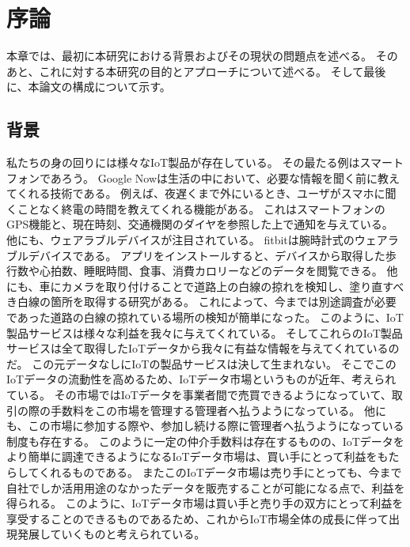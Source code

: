 
\renewcommand{\part}{Contents}
\renewcommand{\prechaptername}{第 }
\renewcommand{\postchaptername}{ 章}

\chapter{序論}
 
本章では、最初に本研究における背景およびその現状の問題点を述べる。
そのあと、これに対する本研究の目的とアプローチについて述べる。
そして最後に、本論文の構成について示す。

\section{背景}
私たちの身の回りには様々なIoT製品が存在している。
その最たる例はスマートフォンであろう。
Google Now\cite{google_now}は生活の中において、必要な情報を聞く前に教えてくれる技術である。
例えば、夜遅くまで外にいるとき、ユーザがスマホに聞くことなく終電の時間を教えてくれる機能がある。
これはスマートフォンのGPS機能と、現在時刻、交通機関のダイヤを参照した上で通知を与えている。
他にも、ウェアラブルデバイスが注目されている。
fitbit\cite{fitbit}は腕時計式のウェアラブルデバイスである。
アプリをインストールすると、デバイスから取得した歩行数や心拍数、睡眠時間、食事、消費カロリーなどのデータを閲覧できる。
他にも、車にカメラを取り付けることで道路上の白線の掠れを検知し、塗り直すべき白線の箇所を取得する研究\cite{dragnman_hakusen}がある。
これによって、今までは別途調査が必要であった道路の白線の掠れている場所の検知が簡単になった。
このように、IoT製品サービスは様々な利益を我々に与えてくれている。
そしてこれらのIoT製品サービスは全て取得したIoTデータから我々に有益な情報を与えてくれているのだ。
この元データなしにIoTの製品サービスは決して生まれない。
そこでこのIoTデータの流動性を高めるため、IoTデータ市場というものが近年、考えられている。
その市場ではIoTデータを事業者間で売買できるようになっていて、取引の際の手数料をこの市場を管理する管理者へ払うようになっている。
他にも、この市場に参加する際や、参加し続ける際に管理者へ払うようになっている制度も存在する。
このように一定の仲介手数料は存在するものの、IoTデータをより簡単に調達できるようになるIoTデータ市場は、買い手にとって利益をもたらしてくれるものである。
またこのIoTデータ市場は売り手にとっても、今まで自社でしか活用用途のなかったデータを販売することが可能になる点で、利益を得られる。
このように、IoTデータ市場は買い手と売り手の双方にとって利益を享受することのできるものであるため、これからIoT市場全体の成長に伴って出現発展していくものと考えられている。

